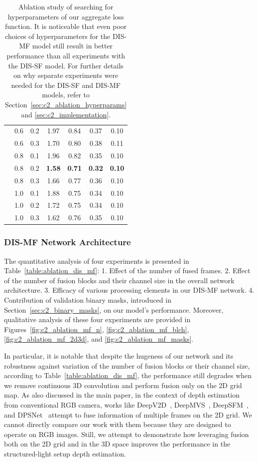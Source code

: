 \begin{table}[t]
\begin{center}
\begin{tabular}{c|cc|cccc}
        & 0.6 & 0.2 & 1.97 & 0.84 & 0.37 & 0.10 \\
        & 0.6 & 0.3 & 1.70 & 0.80 & 0.38 & 0.11 \\
        & 0.8 & 0.1 & 1.96 & 0.82 & 0.35 & 0.10 \\
        & 0.8 & 0.2 & \textbf{1.58} & \textbf{0.71} & \textbf{0.32} & \textbf{0.10} \\
        & 0.8 & 0.3 & 1.66 & 0.77 & 0.36 & 0.10 \\
        & 1.0 & 0.1 & 1.88 & 0.75 & 0.34 & 0.10 \\
        & 1.0 & 0.2 & 1.72 & 0.75 & 0.34 & 0.10 \\
        & 1.0 & 0.3 & 1.62 & 0.76 & 0.35 & 0.10 \\
        \hline
        \end{tabular}
    \end{center}
    \caption{Ablation study of searching for hyperparameters of our aggregate loss function. It is noticeable that even poor choices of hyperparameters for the DIS-MF model still result in better performance than all experiments with the DIS-SF model. For further details on why separate experiments were needed for the DIS-SF and DIS-MF models, refer to Section~\ref{sec:c2_ablation_hyperparams} and \ref{sec:c2_implementation}.}
    \label{table:ablation_hyperparams}
\end{table}

\subsubsection{DIS-MF Network Architecture} \label{sec:c2_ablation_dis_mf}
The quantitative analysis of four experiments is presented in Table~\ref{table:ablation_dis_mf}: 1. Effect of the number of fused frames. 2. Effect of the number of fusion blocks and their channel size in the overall network architecture. 3. Efficacy of various processing elements in our DIS-MF network. 4. Contribution of validation binary masks, introduced in Section~\ref{sec:c2_binary_masks}, on our model's performance. Moreover, qualitative analysis of these four experiments are provided in Figures~\ref{fig:c2_ablation_mf_n}, \ref{fig:c2_ablation_mf_blch}, \ref{fig:c2_ablation_mf_2d3d}, and \ref{fig:c2_ablation_mf_masks}.

In particular, it is notable that despite the hugeness of our network and its robustness against variation of the number of fusion blocks or their channel size, according to Table~\ref{table:ablation_dis_mf}, the performance still degrades when we remove continuous 3D convolution and perform fusion only on the 2D grid map. As also discussed in the main paper, in the context of depth estimation from conventional RGB camera, works like DeepV2D~\cite{teed2019deepv2d}, DeepMVS~\cite{huang2018deepmvs}, DeepSFM~\cite{wei2020deepsfm}, and DPSNet~\cite{im2018dpsnet} attempt to fuse information of multiple frames on the 2D grid. We cannot directly compare our work with them because they are designed to operate on RGB images. Still, we attempt to demonstrate how leveraging fusion both on the 2D grid and in the 3D space improves the performance in the structured-light setup depth estimation.

